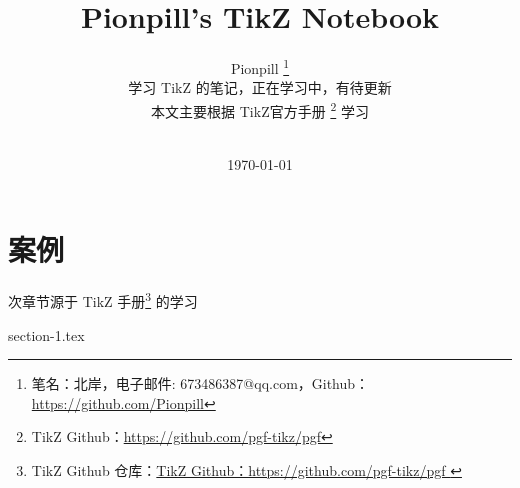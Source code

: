 \documentclass{PionpillNotebook}
\title{Pionpill's TikZ Notebook}
\author{
    Pionpill
    \footnote{笔名：北岸，电子邮件: 673486387@qq.com，Github：\url{https://github.com/Pionpill}}\\[2ex]
    学习 TikZ 的笔记，正在学习中，有待更新 \\
    本文主要根据 TikZ官方手册 \footnote{TikZ Github：\url{https://github.com/pgf-tikz/pgf}}  学习
    
    \\[2ex]
}
\date{\today}
\begin{document}
\maketitle                  %
\tableofcontents            %
\thispagestyle{empty}
\newpage
\setcounter{page}{1}

\chapter{案例}
次章节源于 TikZ 手册\footnote{TikZ Github 仓库：\url{TikZ Github：https://github.com/pgf-tikz/pgf
}} 的学习

\newpage

{section-1.tex}




















\begin{thebibliography}{1}
\end{thebibliography}
\end{document}
